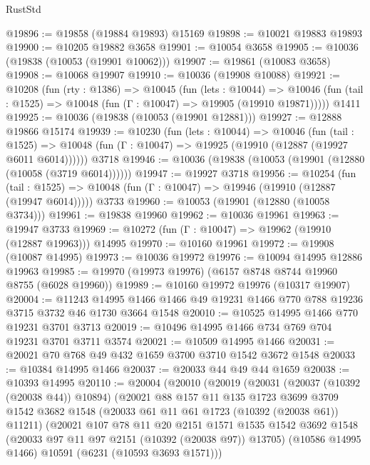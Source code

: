 \begin{lexlean}{RustStd}
\begin{coremodule}
{{@19896 := @19858 (@19884 @19893) @15169
@19898 := @10021 @19883 @19893
@19900 := @10205 @19882 @3658
@19901 := @10054 @3658
@19905 := @10036 (@19838 (@10053 (@19901 @10062)))
@19907 := @19861 (@10083 @3658)
@19908 := @10068 @19907
@19910 := @10036 (@19908 @10088)
@19921 := @10208
    (fun (rty : @1386) =>
    @10045
      (fun (lets : @10044) =>
      @10046 (fun (tail : @1525) => @10048 (fun (Γ : @10047) => @19905 (@19910 @19871)))))
    @1411
@19925 := @10036 (@19838 (@10053 (@19901 @12881)))
@19927 := @12888 @19866 @15174
@19939 := @10230
    (fun (lets : @10044) =>
    @10046
      (fun (tail : @1525) =>
      @10048 (fun (Γ : @10047) => @19925 (@19910 (@12887 (@19927 @6011 @6014))))))
    @3718
@19946 := @10036 (@19838 (@10053 (@19901 (@12880 (@10058 (@3719 @6014))))))
@19947 := @19927 @3718
@19956 := @10254
    (fun (tail : @1525) => @10048 (fun (Γ : @10047) => @19946 (@19910 (@12887 (@19947 @6014)))))
    @3733
@19960 := @10053 (@19901 (@12880 (@10058 @3734)))
@19961 := @19838 @19960
@19962 := @10036 @19961
@19963 := @19947 @3733
@19969 := @10272 (fun (Γ : @10047) => @19962 (@19910 (@12887 @19963))) @14995
@19970 := @10160 @19961
@19972 := @19908 (@10087 @14995)
@19973 := @10036 @19972
@19976 := @10094 @14995 @12886 @19963
@19985 := @19970 (@19973 @19976) (@6157 @8748 @8744 @19960 @8755 (@6028 @19960))
@19989 := @10160 @19972 @19976 (@10317 @19907)
@20004 := @11243
    @14995
    @1466
    @1466
    @49
    @19231
    @1466
    @770
    @788
    @19236
    @3715
    @3732
    @46
    @1730
    @3664
    @1548
@20010 := @10525 @14995 @1466 @770 @19231 @3701 @3713
@20019 := @10496 @14995 @1466 @734 @769 @704 @19231 @3701 @3711 @3574
@20021 := @10509 @14995 @1466
@20031 := @20021 @70 @768 @49 @432 @1659 @3700 @3710 @1542 @3672 @1548
@20033 := @10384 @14995 @1466
@20037 := @20033 @44 @49 @44 @1659
@20038 := @10393 @14995
@20110 := @20004
    (@20010
      (@20019
        (@20031
          (@20037 (@10392 (@20038 @44)) @10894)
          (@20021
            @88
            @157
            @11
            @135
            @1723
            @3699
            @3709
            @1542
            @3682
            @1548
            (@20033 @61 @11 @61 @1723 (@10392 (@20038 @61)) @11211)
            (@20021
              @107
              @78
              @11
              @20
              @2151
              @1571
              @1535
              @1542
              @3692
              @1548
              (@20033 @97 @11 @97 @2151 (@10392 (@20038 @97)) @13705)
              (@10586 @14995 @1466)
              @10591
              (@6231 (@10593 @3693 @1571)))
}}
\end{coremodule}
\end{lexlean}
